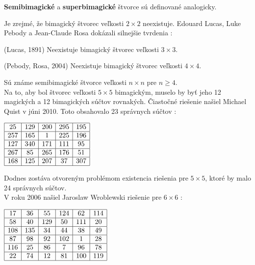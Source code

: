 \begin{note} \textbf{Semibimagické} a \textbf{superbimagické} štvorce sú definované analogicky.
\end{note}

Je zrejmé, že bimagický štvorec veľkosti $2 \times 2$ neexistuje. Edouard Lucas, Luke Pebody a Jean-Claude Rosa dokázali silnejšie tvrdenia \cite{multimagie}:

\begin{theorem} (Lucas, 1891) Neexistuje bimagický štvorec veľkosti $3 \times 3$.
\end{theorem}

\begin{theorem} (Pebody, Rosa, 2004) Neexistuje bimagický štvorec veľkosti $4 \times 4$.
\end{theorem}

Sú známe semibimagické štvorce veľkosti $n \times n$ pre $n \geq 4$. \\

Na to, aby bol štvorec veľkosti $5 \times 5$ bimagickým, muselo by byť jeho 12 magických a 12 bimagických súčtov rovnakých. Čiastočné riešenie našiel Michael Quist v júni 2010. Toto obsahovalo 23 správnych súčtov \cite{multimagie}:

\begin{center}
$\begin{array}{ |c|c|c|c|c| }
\hline
25 & 129 & 200 & 295 & 195 \\ 
\hline
257 & 165 & 1 & 225 & 196  \\ 
\hline
127 & 340 & 171 & 111 & 95 \\ 
\hline
267 & 85 & 265 & 176 & 51 \\ 
\hline
168 & 125 & 207 & 37 & 307 \\
\hline
\end{array}$
\end{center}

Dodnes zostáva otvoreným problémom existencia riešenia pre $5 \times 5$, ktoré by malo 24 správnych súčtov. \\

V roku 2006 našiel Jaroslaw Wroblewski riešenie pre $6 \times 6$ \cite{multimagie}:

\begin{center}
$\begin{array}{ |c|c|c|c|c|c| } 
\hline
17 & 36 & 55 & 124 & 62 & 114 \\ 
\hline
58 & 40 & 129 & 50 & 111 & 20 \\ 
\hline
108 & 135 & 34 & 44 & 38 & 49 \\
\hline
87 & 98 & 92 & 102 & 1 & 28 \\
\hline
116 & 25 & 86 & 7 & 96 & 78 \\
\hline
22 & 74 & 12 & 81 & 100 & 119 \\
\hline
\end{array}$
\end{center}

